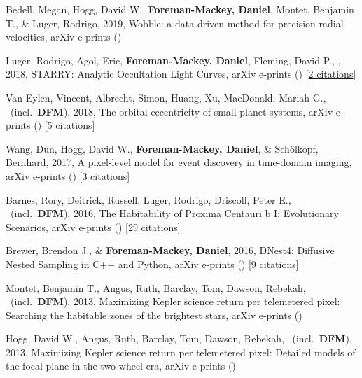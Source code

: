 \item[{\color{numcolor}\scriptsize8}] Bedell, Megan, Hogg, David W., \textbf{Foreman-Mackey, Daniel}, Montet, Benjamin T., \& Luger, Rodrigo, 2019, Wobble: a data-driven method for precision radial velocities, arXiv e-prints ()

\item[{\color{numcolor}\scriptsize7}] Luger, Rodrigo, Agol, Eric, \textbf{Foreman-Mackey, Daniel}, Fleming, David P., \etal, 2018, STARRY: Analytic Occultation Light Curves, arXiv e-prints () [\href{http://adsabs.harvard.edu/abs/2018arXiv181006559L}{2 citations}]

\item[{\color{numcolor}\scriptsize6}] Van Eylen, Vincent, Albrecht, Simon, Huang, Xu, MacDonald, Mariah G., \etal\ (incl.\ \textbf{DFM}), 2018, The orbital eccentricity of small planet systems, arXiv e-prints () [\href{http://adsabs.harvard.edu/abs/2018arXiv180700549V}{5 citations}]

\item[{\color{numcolor}\scriptsize5}] Wang, Dun, Hogg, David W., \textbf{Foreman-Mackey, Daniel}, \& Sch{\"o}lkopf, Bernhard, 2017, A pixel-level model for event discovery in time-domain imaging, arXiv e-prints () [\href{http://adsabs.harvard.edu/abs/2017arXiv171002428W}{3 citations}]

\item[{\color{numcolor}\scriptsize4}] Barnes, Rory, Deitrick, Russell, Luger, Rodrigo, Driscoll, Peter E., \etal\ (incl.\ \textbf{DFM}), 2016, The Habitability of Proxima Centauri b I: Evolutionary Scenarios, arXiv e-prints () [\href{http://adsabs.harvard.edu/abs/2016arXiv160806919B}{29 citations}]

\item[{\color{numcolor}\scriptsize3}] Brewer, Brendon J., \& \textbf{Foreman-Mackey, Daniel}, 2016, DNest4: Diffusive Nested Sampling in C++ and Python, arXiv e-prints () [\href{http://adsabs.harvard.edu/abs/2016arXiv160603757B}{9 citations}]

\item[{\color{numcolor}\scriptsize2}] Montet, Benjamin T., Angus, Ruth, Barclay, Tom, Dawson, Rebekah, \etal\ (incl.\ \textbf{DFM}), 2013, Maximizing Kepler science return per telemetered pixel: Searching the habitable zones of the brightest stars, arXiv e-prints ()

\item[{\color{numcolor}\scriptsize1}] Hogg, David W., Angus, Ruth, Barclay, Tom, Dawson, Rebekah, \etal\ (incl.\ \textbf{DFM}), 2013, Maximizing Kepler science return per telemetered pixel: Detailed models of the focal plane in the two-wheel era, arXiv e-prints ()